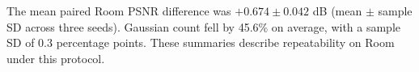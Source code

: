 The mean paired Room PSNR difference was \(+0.674\pm0.042\) dB (mean $\pm$ sample SD across three seeds). Gaussian count fell by 45.6\% on average, with a sample SD of 0.3 percentage points. These summaries describe repeatability on Room under this protocol.
